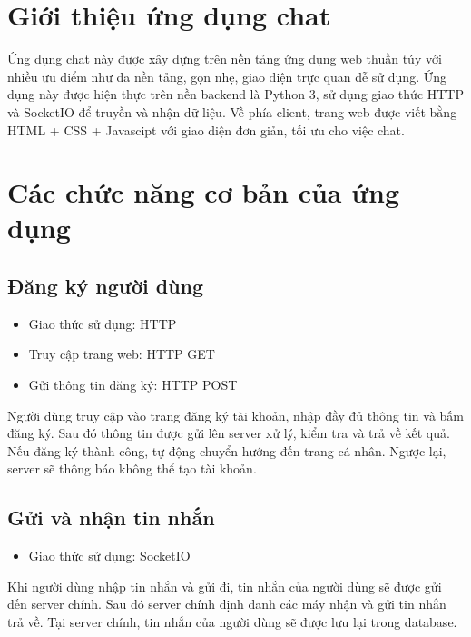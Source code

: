 \documentclass[a4paper]{article}
\begin{document}

\newpage
\tableofcontents
\newpage
\section{Giới thiệu ứng dụng chat}
	Ứng dụng chat này được xây dựng trên nền tảng ứng dụng web thuần túy với nhiều ưu điểm như đa nền tảng, gọn nhẹ, giao diện trực quan dễ sử dụng. Ứng dụng này được hiện thực trên nền backend là Python 3, sử dụng giao thức HTTP và SocketIO để truyền và nhận dữ liệu. Về phía client, trang web được viết bằng HTML + CSS + Javascipt với giao diện đơn giản, tối ưu cho việc chat.
	
\section{Các chức năng cơ bản của ứng dụng}
	\subsection{Đăng ký người dùng}
		\begin{itemize}
			\item Giao thức sử dụng: HTTP
			\item Truy cập trang web: HTTP GET
			\item Gửi thông tin đăng ký: HTTP POST
		\end{itemize}
	
	Người dùng truy cập vào trang đăng ký tài khoản, nhập đầy đủ thông tin và bấm đăng ký. Sau đó thông tin được gửi lên server xử lý, kiểm tra và trả về kết quả. Nếu đăng ký thành công, tự động chuyển hướng đến trang cá nhân. Ngược lại, server sẽ thông báo không thể tạo tài khoản.
	
	\subsection{Gửi và nhận tin nhắn}
	\begin{itemize}
		\item Giao thức sử dụng: SocketIO
	\end{itemize}
	
	Khi người dùng nhập tin nhắn và gửi đi, tin nhắn của người dùng sẽ được gửi đến server chính. Sau đó server chính định danh các máy nhận và gửi tin nhắn trả về.\linebreak
	Tại server chính, tin nhắn của người dùng sẽ được lưu lại trong database.
	
\end{document}
